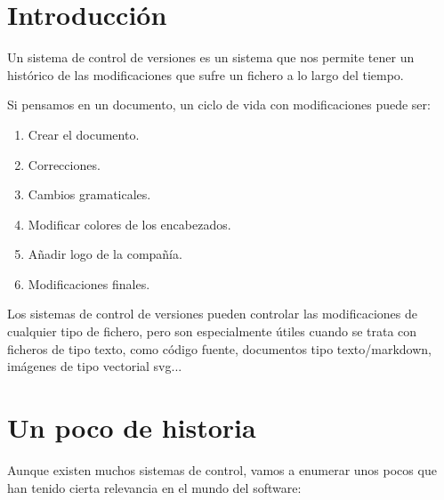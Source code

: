 \chapter{Introducción}

Un sistema de control de versiones es un sistema que nos permite tener un histórico de las modificaciones que sufre un fichero a lo largo del tiempo.

Si pensamos en un documento, un ciclo de vida con modificaciones puede ser:

\begin{enumerate}
    \item Crear el documento.
    \item Correcciones.
    \item Cambios gramaticales.
    \item Modificar colores de los encabezados.
    \item Añadir logo de la compañía.
    \item Modificaciones finales.
\end{enumerate}

Los sistemas de control de versiones pueden controlar las modificaciones de cualquier tipo de fichero, pero son especialmente útiles cuando se trata con ficheros de tipo texto, como código fuente, documentos tipo texto/markdown, imágenes de tipo vectorial svg...




\chapter{Un poco de historia}

Aunque existen muchos sistemas de control, vamos a enumerar unos pocos que han tenido cierta relevancia en el mundo del software:


